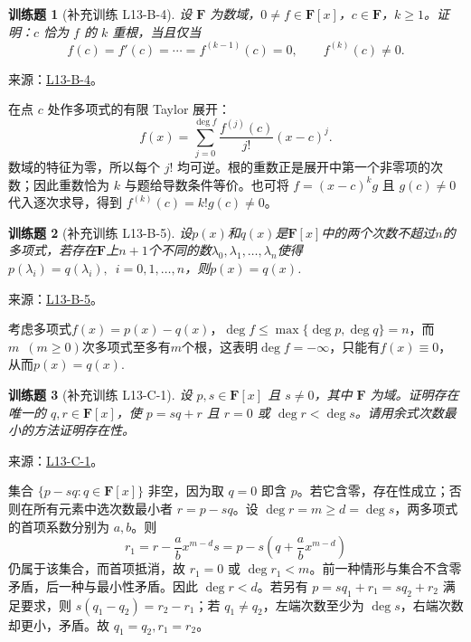 \documentclass[UTF8,12pt,a4paper,fontset=fandol]{ctexart}
\newtheorem{exercise}{训练题}[section]
\begin{document}
\begin{exercise}[补充训练 L13-B-4]\label{prob:L13-B-4}
设 $\mathbf F$ 为数域，$0\ne f\in\mathbf F[x]$，$c\in\mathbf F$，$k\ge1$。证明：$c$ 恰为 $f$ 的 $k$ 重根，当且仅当
\[f(c)=f'(c)=\cdots=f^{(k-1)}(c)=0,\qquad f^{(k)}(c)\ne0.\]
\end{exercise}
\noindent 来源：\href{https://github.com/yhwu-is/Linear-Algebra-Left-Undone/blob/new/%E8%AE%B2%E4%B9%89/%E4%B8%93%E9%A2%98/13%20%E5%A4%9A%E9%A1%B9%E5%BC%8F.tex}{L13-B-4}。
\begin{solve}
在点 $c$ 处作多项式的有限 Taylor 展开：
\[f(x)=\sum_{j=0}^{\deg f}\frac{f^{(j)}(c)}{j!}(x-c)^j.\]
数域的特征为零，所以每个 $j!$ 均可逆。根的重数正是展开中第一个非零项的次数；因此重数恰为 $k$ 与题给导数条件等价。也可将 $f=(x-c)^kg$ 且 $g(c)\ne0$ 代入逐次求导，得到 $f^{(k)}(c)=k!g(c)\ne0$。
\end{solve}

\begin{exercise}[补充训练 L13-B-5]\label{prob:L13-B-5}
设$p(x)$和$q(x)$是$\mathbf{F}[x]$中的两个次数不超过$n$的多项式，若存在$\mathbf{F}$上$n+1$个不同的数$\lambda_0,\lambda_1,\ldots,\lambda_n$使得$p(\lambda_i)=q(\lambda_i),\enspace i=0,1,\ldots,n$，则$p(x)=q(x)$.
\end{exercise}
\noindent 来源：\href{https://github.com/yhwu-is/Linear-Algebra-Left-Undone/blob/new/%E8%AE%B2%E4%B9%89/%E4%B8%93%E9%A2%98/13%20%E5%A4%9A%E9%A1%B9%E5%BC%8F.tex}{L13-B-5}。
\begin{solve}
考虑多项式$f(x)=p(x)-q(x)$，$\deg f\leqslant \max\{\deg p,\deg q\}=n$，而$m\enspace(m\geqslant 0)$次多项式至多有$m$个根，这表明$\deg f=-\infty$，只能有$f(x)\equiv 0$，从而$p(x)=q(x)$.
\end{solve}

\begin{exercise}[补充训练 L13-C-1]\label{prob:L13-C-1}
设 $p,s\in\mathbf F[x]$ 且 $s\ne0$，其中 $\mathbf F$ 为域。证明存在唯一的 $q,r\in\mathbf F[x]$，使 $p=sq+r$ 且 $r=0$ 或 $\deg r<\deg s$。请用余式次数最小的方法证明存在性。
\end{exercise}
\noindent 来源：\href{https://github.com/yhwu-is/Linear-Algebra-Left-Undone/blob/new/%E8%AE%B2%E4%B9%89/%E4%B8%93%E9%A2%98/13%20%E5%A4%9A%E9%A1%B9%E5%BC%8F.tex}{L13-C-1}。
\begin{solve}
集合 $\{p-sq:q\in\mathbf F[x]\}$ 非空，因为取 $q=0$ 即含 $p$。若它含零，存在性成立；否则在所有元素中选次数最小者 $r=p-sq$。设 $\deg r=m\ge d=\deg s$，两多项式的首项系数分别为 $a,b$。则
\[r_1=r-\frac abx^{m-d}s=p-s\left(q+\frac abx^{m-d}\right)\]
仍属于该集合，而首项抵消，故 $r_1=0$ 或 $\deg r_1<m$。前一种情形与集合不含零矛盾，后一种与最小性矛盾。因此 $\deg r<d$。若另有 $p=sq_1+r_1=sq_2+r_2$ 满足要求，则 $s(q_1-q_2)=r_2-r_1$；若 $q_1\ne q_2$，左端次数至少为 $\deg s$，右端次数却更小，矛盾。故 $q_1=q_2,r_1=r_2$。
\end{solve}
\end{document}
